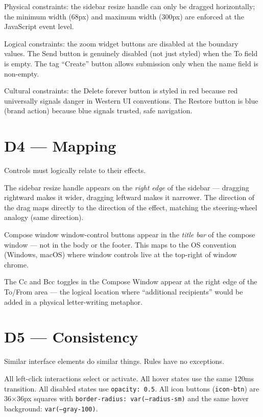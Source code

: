 \documentclass[12pt,a4paper]{report}
\begin{document}
Physical constraints: the sidebar resize handle can only be dragged horizontally; the minimum
width (68px) and maximum width (300px) are enforced at the JavaScript event level.

Logical constraints: the zoom widget buttons are disabled at the boundary values. The Send
button is genuinely disabled (not just styled) when the To field is empty. The tag ``Create''
button allows submission only when the name field is non-empty.

Cultural constraints: the Delete forever button is styled in red because red universally
signals danger in Western UI conventions. The Restore button is blue (brand action) because
blue signals trusted, safe navigation.

\section{D4 — Mapping}

Controls must logically relate to their effects.

The sidebar resize handle appears on the \textit{right edge} of the sidebar — dragging
rightward makes it wider, dragging leftward makes it narrower. The direction of the drag maps
directly to the direction of the effect, matching the steering-wheel analogy (same direction).

Compose window window-control buttons appear in the \textit{title bar} of the compose window —
not in the body or the footer. This maps to the OS convention (Windows, macOS) where window
controls live at the top-right of window chrome.

The Cc and Bcc toggles in the Compose Window appear at the right edge of the To/From area —
the logical location where ``additional recipients'' would be added in a physical letter-writing
metaphor.

\section{D5 — Consistency}

Similar interface elements do similar things. Rules have no exceptions.

All left-click interactions select or activate. All hover states use the same 120ms
transition. All disabled states use \texttt{opacity: 0.5}. All icon buttons (\texttt{icon-btn})
are 36$\times$36px squares with \texttt{border-radius: var(--radius-sm)} and the same
hover background: \texttt{var(--gray-100)}.
\end{document}
